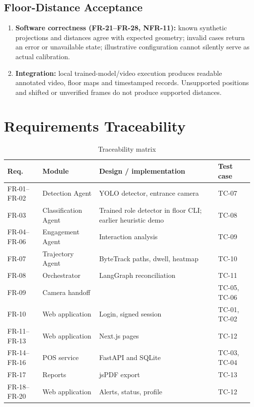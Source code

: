 \subsection{Floor-Distance Acceptance}
\begin{enumerate}
\item \textbf{Software correctness (FR-21--FR-28, NFR-11):} known synthetic projections and distances agree with expected geometry; invalid cases return an error or unavailable state; illustrative configuration cannot silently serve as actual calibration.
\item \textbf{Integration:} local trained-model/video execution produces readable annotated video, floor maps and timestamped records. Unsupported positions and shifted or unverified frames do not produce supported distances.
\end{enumerate}

\section{Requirements Traceability}
\begin{longtable}{P{0.12\textwidth}P{0.22\textwidth}P{0.3\textwidth}P{0.18\textwidth}}
\caption{Traceability matrix}\\
\toprule
Req. & Module & Design / implementation & Test case\\
\midrule
\endhead
FR-01--FR-02 & Detection Agent & YOLO detector, entrance camera & TC-07\\
FR-03 & Classification Agent & Trained role detector in floor CLI; earlier heuristic demo & TC-08\\
FR-04--FR-06 & Engagement Agent & Interaction analysis & TC-09\\
FR-07 & Trajectory Agent & ByteTrack paths, dwell, heatmap & TC-10\\
FR-08 & Orchestrator & LangGraph reconciliation & TC-11\\
FR-09 & Camera handoff &  & TC-05, TC-06\\
FR-10 & Web application & Login, signed session & TC-01, TC-02\\
FR-11--FR-13 & Web application & Next.js pages & TC-12\\
FR-14--FR-16 & POS service & FastAPI and SQLite & TC-03, TC-04\\
FR-17 & Reports & jsPDF export & TC-13\\
FR-18--FR-20 & Web application & Alerts, status, profile & TC-12\\
\bottomrule
\end{longtable}

